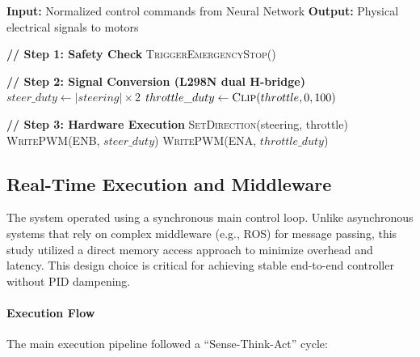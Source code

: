 \begin{algorithm}[H]
\caption{Actuation: Hardware Control Interface}
\label{alg:actuation_logic}
\begin{algorithmic}[1]

    \State \textbf{Input:} Normalized control commands from Neural Network
    \State \textbf{Output:} Physical electrical signals to motors

    \Statex
    \State \textbf{// Step 1: Safety Check}
        \State \textsc{TriggerEmergencyStop}()
        \State \Return
    \EndIf

    \Statex
    \State \textbf{// Step 2: Signal Conversion (L298N dual H-bridge)}
    \State {}
    \State $steer\_duty \gets |steering| \times 2$ 
    \State $throttle\_duty \gets \textsc{Clip}(throttle, 0, 100)$

    \Statex
    \State \textbf{// Step 3: Hardware Execution}
    \State \textsc{SetDirection}(steering, throttle) 
    \State \textsc{WritePWM}(ENB, $steer\_duty$) 
    \State \textsc{WritePWM}(ENA, $throttle\_duty$) 

\EndFunction

\end{algorithmic}
\end{algorithm}

\subsection{Real-Time Execution and Middleware}
\label{sec:realtime_execution}

The system operated using a synchronous main control loop. Unlike asynchronous systems that rely on complex middleware (e.g., ROS) for message passing, this study utilized a direct memory access approach to minimize overhead and latency. This design choice is critical for achieving stable end-to-end controller without PID dampening.

\paragraph{Execution Flow}
The main execution pipeline followed a ``Sense-Think-Act'' cycle:

